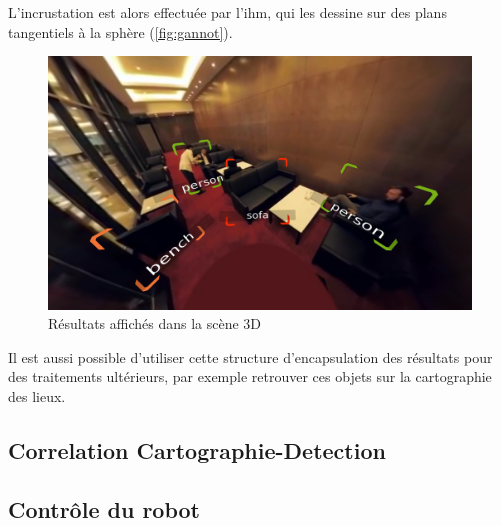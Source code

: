 			L'incrustation est alors effectuée par l'\gls{ihm}, qui les dessine sur des plans tangentiels à la sphère (\autoref{fig:gannot}).

			\begin{figure}[H]
			{
				\centering
				\includegraphics[width=.8\textwidth]{figures/gannot.png}
				\caption{Résultats affichés dans la scène 3D}
				\label{fig:gannot}
			}
			\end{figure}
			
			Il est aussi possible d'utiliser cette structure d'encapsulation des résultats pour des traitements ultérieurs, par exemple retrouver ces objets sur la cartographie des lieux.
		
		\subsection{Correlation Cartographie-Detection}
		\label{sub:corr}
		
		
			
		\subsection{Contrôle du robot}
		
